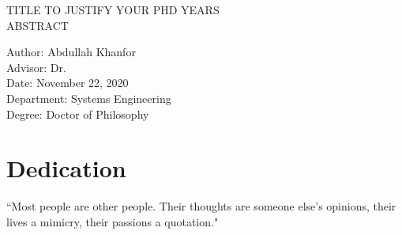 \documentclass[12pt]{report}
\newcommand{\thesistitle}{TITLE TO JUSTIFY YOUR PHD YEARS}
\newcommand{\thesisname}{Abdullah Khanfor}
\newcommand{\thesischairadvisor}{Dr. }    %
\newcommand{\thesisdepartment}{Systems Engineering}
\newcommand{\thesisdate}{November 22, 2020}
\newcommand{\thesisdegree}{Doctor of Philosophy}
\begin{document}
\newpage
\doublespacing

\begin{center}
    {\thesistitle}\\ 
    {ABSTRACT}\\
    \vspace{.05in}
\end{center}

\vspace{0.4in}
\begin{flushleft}
Author: \thesisname \\
Advisor: \thesischairadvisor \\
Date: \thesisdate \\
Department: \thesisdepartment \\
Degree: \thesisdegree \\
\end{flushleft}
\newpage

\chapter*{Dedication}
\strut \vspace{2in}
\begin{center}
``Most people are other people. Their thoughts are someone else's opinions, their lives a mimicry, their passions a quotation."
    \end{center}
    \vfill \strut
    \newpage
\newpage


\newpage

\setcounter{tocdepth}{2} %

\tableofcontents

\newpage

\listoftables
\newpage

\listoffigures{}
\newpage
\end{document}
